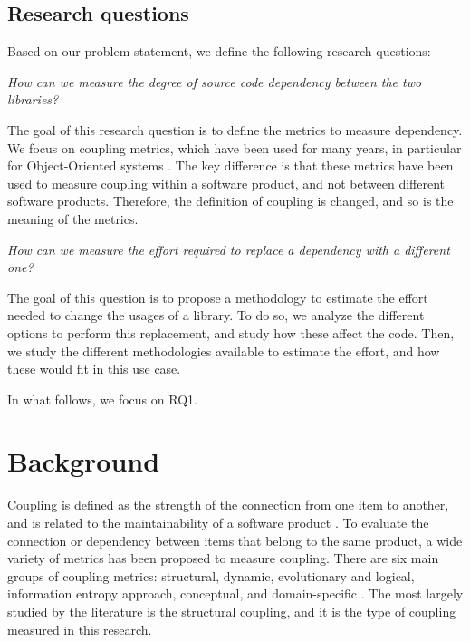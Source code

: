 \documentclass[a4paper]{article}
\begin{document}
\subsection{Research questions}
Based on our problem statement, we define the following research questions:

\begin{description}[noitemsep,leftmargin=*]
  \item [\textbf{RQ1:}] \textit{How can we measure the degree of source code dependency between the two libraries?}

  The goal of this research question is to define the metrics to measure dependency. We focus on coupling metrics, which have been used for many years, in particular for Object-Oriented systems \cite{briand1999unified}. The key difference is that these metrics have been used to measure coupling within a software product, and not between different software products. Therefore, the definition of coupling is changed, and so is the meaning of the metrics.

  \item [\textbf{RQ2:}] \textit{How can we measure the effort required to replace a dependency with a different one?}

  The goal of this question is to propose a methodology to estimate the effort needed to change the usages of a library. To do so, we analyze the different options to perform this replacement, and study how these affect the code. Then, we study the different methodologies available to estimate the effort, and how these would fit in this use case.
\end{description}

In what follows, we focus on RQ1.

\section{Background}\label{section:Background}
Coupling is defined  as the strength of the connection from one item to another, and is related to the maintainability of a software product \cite{gupta2009package}. To evaluate the connection or dependency between items that belong to the same product, a wide variety of metrics has been proposed to measure coupling.
There are six main groups of coupling metrics: structural, dynamic, evolutionary and logical, information entropy approach, conceptual, and domain-specific  \cite{poshyvanyk2006conceptual}. The most largely studied by the literature is the structural coupling, and it is the type of coupling measured in this research.
\end{document}
